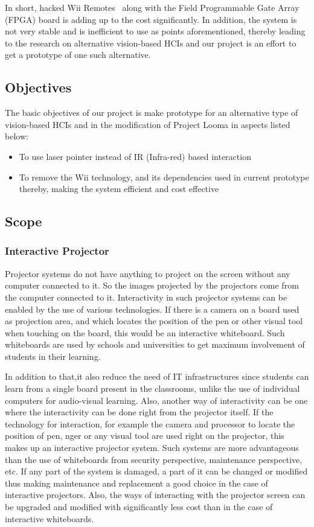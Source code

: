 \documentclass[12pt, a4paper]{article}
\begin{document}
In short, hacked Wii Remotes~\cite{joh} along with the Field Programmable Gate Array (FPGA) board is adding up to the cost significantly. In addition, the system is not very stable and is inefficient to use as points aforementioned, thereby leading to the research on alternative vision-based HCIs and our project is an effort to get
a prototype of one such alternative.

\subsection{Objectives}
The basic objectives of our project is make prototype for an alternative type of vision-based HCIs and in the modification of Project Looma in aspects listed below:
\begin{itemize}
	\item To use laser pointer instead of IR (Infra-red) based interaction
	\item To remove the Wii technology, and its dependencies used in current prototype thereby, making the system efficient and cost effective
\end{itemize}

\subsection{Scope}
\subsubsection{Interactive Projector}
Projector systems do not have anything to project on the screen without
any computer connected to it. So the images projected by the projectors
come from the computer connected to it. Interactivity in such projector
systems can be enabled by the use of various technologies. If there is a camera
on a board used as projection area, and which locates the position of the pen
or other visual tool when touching on the board, this would be an interactive
whiteboard. Such whiteboards are used by schools and universities to get
maximum involvement of students in their learning. 

In addition to that,it also reduce the need of IT infrastructures since students can learn from a
single board present in the classrooms, unlike the use of individual computers
for audio-visual learning. Also, another way of interactivity can be one where
the interactivity can be done right from the projector itself. If the technology
for interaction, for example the camera and processor to locate the position
of pen, nger or any visual tool are used right on the projector, this makes up
an interactive projector system. Such systems are more advantageous than
the use of whiteboards from security perspective, maintenance perspective,
etc. If any part of the system is damaged, a part of it can be changed
or modified thus making maintenance and replacement a good choice in the
case of interactive projectors. Also, the ways of interacting with the projector
screen can be upgraded and modified with significantly less cost than in the
case of interactive whiteboards. 
\end{document}
